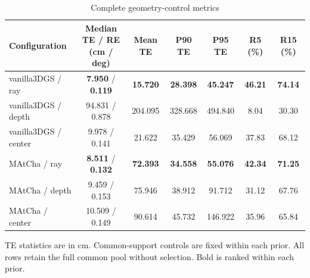 \begin{table}[tp]
\centering
\footnotesize
\setlength{\tabcolsep}{4pt}
\renewcommand{\arraystretch}{1.12}
\caption{Complete geometry-control metrics}
\label{tab:s_geometry}
\begin{tabular}{lcccccc}
\toprule
Configuration & \shortstack{Median TE / RE\\(cm / deg)} & Mean TE & P90 TE & P95 TE & R5 (\%) & R15 (\%) \\
\midrule
vanilla3DGS / ray & \textbf{7.950} / \textbf{0.119} & \textbf{15.720} & \textbf{28.398} & \textbf{45.247} & \textbf{46.21} & \textbf{74.14} \\
vanilla3DGS / depth & 94.831 / 0.878 & 204.095 & 328.668 & 494.840 & 8.04 & 30.30 \\
vanilla3DGS / center & 9.978 / 0.141 & 21.622 & 35.429 & 56.069 & 37.83 & 68.12 \\
MAtCha / ray & \textbf{8.511} / \textbf{0.132} & \textbf{72.393} & \textbf{34.558} & \textbf{55.076} & \textbf{42.34} & \textbf{71.25} \\
MAtCha / depth & 9.459 / 0.153 & 75.946 & 38.912 & 91.712 & 31.12 & 67.76 \\
MAtCha / center & 10.509 / 0.149 & 90.614 & 45.732 & 146.922 & 35.96 & 65.84 \\
\bottomrule
\end{tabular}
\par\smallskip\begin{minipage}{0.98\linewidth}\footnotesize TE statistics are in cm. Common-support controls are fixed within each prior. All rows retain the full common pool without selection. Bold is ranked within each prior.\end{minipage}
\end{table}

